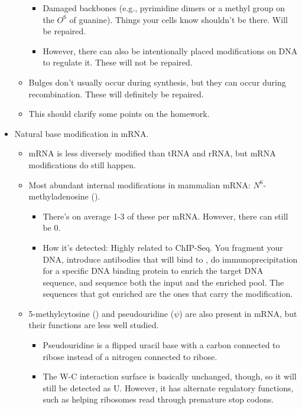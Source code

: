\documentclass[../notes.tex]{subfiles}
\begin{document}
\begin{itemize}
\begin{itemize}
        \begin{itemize}
            \item Damaged backbones (e.g., pyrimidine dimers or a methyl group on the $O^6$ of guanine). Things your cells know shouldn't be there. Will be repaired.
            \item However, there can also be intentionally placed modifications on DNA to regulate it. These will not be repaired.
        \end{itemize}
        \item Bulges don't usually occur during synthesis, but they can occur during recombination. These will definitely be repaired.
        \item This should clarify some points on the homework.
    \end{itemize}
    \item Natural base modification in mRNA.
    \begin{itemize}
        \item mRNA is less diversely modified than tRNA and rRNA, but mRNA modifications do still happen.
        \item Most abundant internal modifications in mammalian mRNA: $N^6$-methyladenosine ().
        \begin{itemize}
            \item There's on average 1-3 of these per mRNA. However, there can still be 0.
            \item How it's detected: Highly related to ChIP-Seq. You fragment your DNA, introduce antibodies that will bind to , do immunoprecipitation for a specific DNA binding protein to enrich the target DNA sequence, and sequence both the input and the enriched pool. The sequences that got enriched are the ones that carry the modification.
        \end{itemize}
        \item 5-methylcytosine () and pseudouridine ($\psi$) are also present in mRNA, but their functions are less well studied.
        \begin{itemize}
            \item Pseudouridine is a flipped uracil base with a carbon connected to ribose instead of a nitrogen connected to ribose.
            \item The W-C interaction surface is basically unchanged, though, so it will still be detected as U. However, it has alternate regulatory functions, such as helping ribosomes read through premature stop codons.

\end{itemize}
\end{itemize}
\end{itemize}
\end{document}
